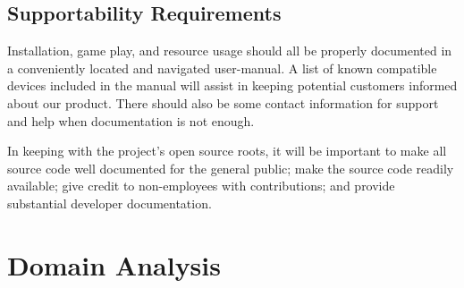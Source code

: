 \documentclass[12pt]{article}
\begin{document}
\subsection{Supportability Requirements}
Installation, game play, and resource usage should all be properly documented in a conveniently located and navigated user-manual. A list of known compatible devices included in the manual will assist in keeping potential customers informed about our product.  There should also be some contact information for support and help when documentation is not enough.

In keeping with the project's open source roots, it will be important to make all source code well documented for the general public; make the source code readily available; give credit to non-employees with contributions; and provide substantial developer documentation. 


\section{Domain Analysis}
\end{document}
